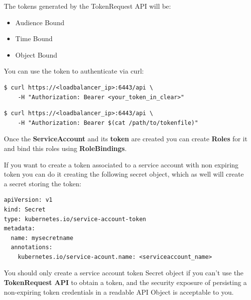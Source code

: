 \documentclass{article}
\newenvironment{blocktemplateI}[1]{%
    \tcolorbox[beamer,%
    noparskip,breakable,
    colframe=Violet,%
    colbacklower=Black,%
    title=#1]}%
    {\endtcolorbox}
\newenvironment{blocktemplateIII}[1]{%
    \tcolorbox[beamer,%
    noparskip,breakable,
    ,colframe=Red,%
    colbacklower=LimeGreen!75!LightGreen,%
    title=#1]}%
    {\endtcolorbox}
\newenvironment{codetemplate}[1][]{%
  \mybasecolorbox[#1]
  \itshape
}{%
  \endmybasecolorbox
}
\begin{document}
The tokens generated by the TokenRequest API will be:
\begin{itemize}
    \item Audience Bound
    \item Time Bound
    \item Object Bound
\end{itemize}

\begin{blocktemplateI}{NOTE}
You can use the token to authenticate via curl:
\begin{codetemplate}{}
\begin{verbatim}
$ curl https://<loadbalancer_ip>:6443/api \
    -H "Authorization: Bearer <your_token_in_clear>"
\end{verbatim}
\end{codetemplate}
\begin{codetemplate}{}
\begin{verbatim}
$ curl https://<loadbalancer_ip>:6443/api \
    -H "Authorization: Bearer $(cat /path/to/tokenfile)"
\end{verbatim}
\end{codetemplate}
\end{blocktemplateI}

Once the \textbf{ServiceAccount} and its \textbf{token} are created you can create \textbf{Roles} for it and bind this roles using \textbf{RoleBindings}.

\begin{blocktemplateIII}{WARNING}
If you want to create a token associated to a service account with non expiring token you can do it creating the following secret object, which as well will create a secret storing the token:
\begin{codetemplate}{}
\begin{verbatim}
apiVersion: v1
kind: Secret
type: kubernetes.io/service-account-token
metadata:
  name: mysecretname
  annotations:
    kubernetes.io/service-acount.name: <serviceaccount_name>
\end{verbatim}
\end{codetemplate}
You should only create a service account token Secret object if you can't use the \textbf{TokenRequest API} to obtain a token, and the security exposure of persisting a non-expiring token credentials in a readable API Object is acceptable to you.
\end{blocktemplateIII}
\end{document}
